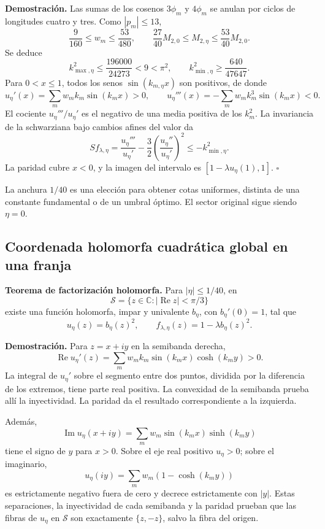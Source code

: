 \textbf{Demostración.} Las sumas de los cosenos \(3\phi_m\) y \(4\phi_m\) se anulan por ciclos de longitudes cuatro y tres. Como \(|p_m|\le13\),
\[
\frac9{160}\le w_m\le\frac{53}{480},\qquad
\frac{27}{40}M_{2,0}\le M_{2,\eta}\le\frac{53}{40}M_{2,0}.
\]
Se deduce
\[
k_{\max,\eta}^2\le\frac{196000}{24273}<9<\pi^2,\qquad
k_{\min,\eta}^2\ge\frac{640}{47647}.
\]
Para \(0<x\le1\), todos los senos \(\sin(k_{m,\eta}x)\) son positivos, de donde
\[
u_\eta'(x)=\sum_mw_mk_m\sin(k_mx)>0,\qquad
u_\eta'''(x)=-\sum_mw_mk_m^3\sin(k_mx)<0.
\]
El cociente \(u_\eta'''/u_\eta'\) es el negativo de una media positiva de los \(k_m^2\). La invariancia de la schwarziana bajo cambios afines del valor da
\[
S f_{\lambda,\eta}
=\frac{u_\eta'''}{u_\eta'}-\frac32
\left(\frac{u_\eta''}{u_\eta'}\right)^2
\le-k_{\min,\eta}^2.
\]
La paridad cubre \(x<0\), y la imagen del intervalo es
\([1-\lambda u_\eta(1),1]\). \(\square\)

La anchura \(1/40\) es una elección para obtener cotas uniformes, distinta de una constante fundamental o de un umbral óptimo. El sector original sigue siendo \(\eta=0\).


\subsection{Coordenada holomorfa cuadrática global en una franja}
\label{hmtfg:desarrollo:4}

\textbf{Teorema de factorización holomorfa.} Para \(|\eta|\le1/40\), en
\[
\mathcal S=\{z\in\mathbb C:|\operatorname{Re}z|<\pi/3\}
\]
existe una función holomorfa, impar y univalente \(b_\eta\), con \(b_\eta'(0)=1\), tal que
\[
\boxed{u_\eta(z)=b_\eta(z)^2,\qquad
f_{\lambda,\eta}(z)=1-\lambda b_\eta(z)^2.}
\]

\textbf{Demostración.} Para \(z=x+iy\) en la semibanda derecha,
\[
\operatorname{Re}u_\eta'(z)
=\sum_mw_mk_m\sin(k_mx)\cosh(k_my)>0.
\]
La integral de \(u_\eta'\) sobre el segmento entre dos puntos, dividida por la diferencia de los extremos, tiene parte real positiva. La convexidad de la semibanda prueba allí la inyectividad. La paridad da el resultado correspondiente a la izquierda.

Además,
\[
\operatorname{Im}u_\eta(x+iy)
=\sum_mw_m\sin(k_mx)\sinh(k_my)
\]
tiene el signo de \(y\) para \(x>0\). Sobre el eje real positivo \(u_\eta>0\); sobre el imaginario,
\[
u_\eta(iy)=\sum_mw_m(1-\cosh(k_my))
\]
es estrictamente negativo fuera de cero y decrece estrictamente con \(|y|\). Estas separaciones, la inyectividad de cada semibanda y la paridad prueban que las fibras de \(u_\eta\) en \(\mathcal S\) son exactamente \(\{z,-z\}\), salvo la fibra del origen.

